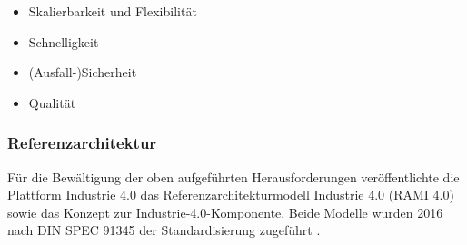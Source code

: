 \begin{itemize}
  \item Skalierbarkeit und Flexibilität
  \item Schnelligkeit
  \item (Ausfall-)Sicherheit
  \item Qualität
\end{itemize}

\subsubsection{Referenzarchitektur}\label{rami}

Für die Bewältigung der oben aufgeführten Herausforderungen veröffentlichte die Plattform Industrie 4.0 das \glqq Referenzarchitekturmodell Industrie 4.0\grqq{} (RAMI 4.0) sowie das Konzept zur \glqq Industrie-4.0-Komponente\grqq{}. Beide Modelle wurden 2016 nach DIN SPEC 91345 der Standardisierung zugeführt \citep{Beuth2016}.

